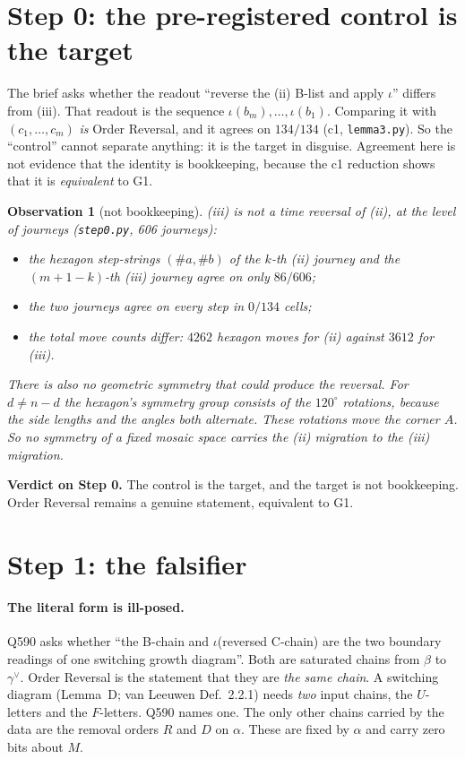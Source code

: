 \documentclass[11pt]{article}
\newtheorem{observation}[theorem]{Observation}
\theoremstyle{definition}
\begin{document}
\section{Step 0: the pre-registered control is the target}
The brief asks whether the readout ``reverse the (ii) B-list and apply $\iota$'' differs from (iii). That readout is the
sequence $\iota(b_m),\dots,\iota(b_1)$. Comparing it with $(c_1,\dots,c_m)$ \emph{is} Order Reversal, and it agrees on $134/134$
(c1, \texttt{lemma3.py}). So the ``control'' cannot separate anything: it is the target in disguise. Agreement here is not
evidence that the identity is bookkeeping, because the c1 reduction shows that it is \emph{equivalent} to G1.

\begin{observation}[not bookkeeping]\label{obs:notbk}
(iii) is not a time reversal of (ii), at the level of journeys (\texttt{step0.py}, 606 journeys):
\begin{itemize}
\item the hexagon step-strings $(\#a,\#b)$ of the $k$-th (ii) journey and the $(m{+}1{-}k)$-th (iii) journey agree on only $86/606$;
\item the two journeys agree on every step in $0/134$ cells;
\item the total move counts differ: $4262$ hexagon moves for (ii) against $3612$ for (iii).
\end{itemize}
There is also no geometric symmetry that could produce the reversal. For $d\ne n-d$ the hexagon's symmetry group consists of
the $120^\circ$ rotations, because the side lengths and the angles both alternate. These rotations move the corner $A$. So no
symmetry of a fixed mosaic space carries the (ii) migration to the (iii) migration.
\end{observation}
\textbf{Verdict on Step 0.} The control is the target, and the target is not bookkeeping. Order Reversal remains a genuine
statement, equivalent to G1.

\section{Step 1: the falsifier}
\paragraph{The literal form is ill-posed.} Q590 asks whether ``the B-chain and $\iota$(reversed C-chain) are the two boundary
readings of one switching growth diagram''. Both are saturated chains from $\beta$ to $\gamma^\vee$. Order Reversal is the
statement that they are \emph{the same chain}. A switching diagram (Lemma~D; van Leeuwen Def.~2.2.1) needs \emph{two}
input chains, the $U$-letters and the $F$-letters. Q590 names one. The only other chains carried by the data are the
removal orders $R$ and $D$ on $\alpha$. These are fixed by $\alpha$ and carry zero bits about $M$.
\end{document}
